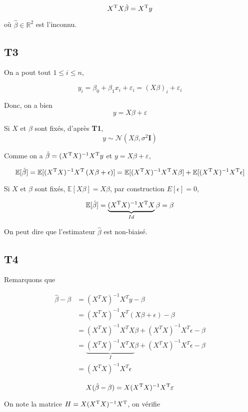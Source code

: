 \documentclass[a4paper,12pt]{article}
\begin{document}
$$ X{^\text T}X\hat\beta = X^{\text T}y $$

où $\hat\beta \in \mathbb{R}^2$ est l'inconnu.

\subsection*{T3}

On a pout tout $1 \le i \le n$,

$$ y_i = \beta_0 + \beta_1x_i+\varepsilon_i = (X\beta)_i +\varepsilon_i$$

Donc, on a bien
$$y = X\beta + \varepsilon$$

Si $X$ et $\beta$ sont fixés, d'après \textbf{T1}, 
$$ y \sim \mathcal{N}(X\beta, \sigma^2\pmb{I}) $$

Comme on a $\hat\beta = (X{^\text T}X)^{-1}X^{\text T}y$ et $y = X\beta + \varepsilon$,

$$ \mathbb E[\hat\beta] = \mathbb E[(X{^\text T}X)^{-1}X^{\text T}\left(X\beta + \epsilon\right)] = \mathbb E[(X{^\text T}X)^{-1}X^{\text T}X\beta] + \mathbb E[(X{^\text T}X)^{-1}X^{\text T}\epsilon] $$

Si $X$ et $\beta$ sont fixés, $\mathbb E[X\beta] = X\beta$, par construction $E[\epsilon] = 0$,

$$ \mathbb E[\hat\beta] = \underbrace{(X{^\text T}X)^{-1}X^{\text T}X}_{Id}\beta = \beta$$

On peut dire que l'estimateur $\hat\beta$ est non-biaisé.
\subsection*{T4}


Remarquons que

\[
\begin{aligned}
	\hat{\beta} - \beta &= (X^T X)^{-1}X^T y - \beta \\
	&= (X^T X)^{-1}X^T (X\beta + \epsilon) - \beta \\
	&= (X^T X)^{-1}X^T X\beta + (X^T X)^{-1}X^T \epsilon - \beta \\
	&= \underbrace{(X^T X)^{-1}X^T X}_{I}\beta + (X^T X)^{-1}X^T \epsilon - \beta \\
	&= (X^T X)^{-1}X^T \epsilon
\end{aligned}
\]


$$ X(\hat \beta - \beta) = X(X^{\text T}X)^{-1}X^{\text T}\varepsilon $$

On note la matrice $H = X(X^{\text T}X)^{-1}X^{\text T}$, on vérifie
\end{document}
